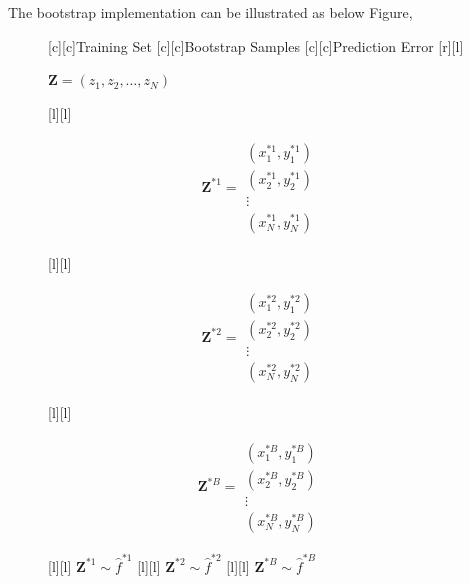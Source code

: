 \documentclass[12pt,a4paper]{article}%
\theoremstyle{definition}
\theoremstyle{plain}
\numberwithin{equation}{section}
\begin{document}
The bootstrap implementation can be illustrated as below Figure,
\begin{framed}
\begin{figure}[H]
\centering
{}[c][c]{Training Set}
[c][c]{Bootstrap Samples}
[c][c]{Prediction Error}
[r][l]{\parbox{1cm} {$\boldsymbol{Z}=(z_{1},z_{2},\dots,z_{N})$}}
[l][l]{\footnotesize \parbox{1cm}{  
\begin{gather*}
\boldsymbol{Z}^{*1} = 
\begin{array}{c}
(x^{*1}_{1},y^{*1}_{1}) \\
(x^{*1}_{2},y^{*1}_{2}) \\
\vdots \\
(x^{*1}_{N},y^{*1}_{N})
\end{array}
\end{gather*}
}}
[l][l]{\footnotesize \parbox{1cm}{  
\begin{gather*}
\boldsymbol{Z}^{*2} = 
\begin{array}{c}
(x^{*2}_{1},y^{*2}_{1}) \\
(x^{*2}_{2},y^{*2}_{2}) \\
\vdots \\
(x^{*2}_{N},y^{*2}_{N})
\end{array}
\end{gather*}
}}
[l][l]{\footnotesize \parbox{1cm}{  
\begin{gather*}
\boldsymbol{Z}^{*B} = 
\begin{array}{c}
(x^{*B}_{1},y^{*B}_{1}) \\
(x^{*B}_{2},y^{*B}_{2}) \\
\vdots \\
(x^{*B}_{N},y^{*B}_{N})
\end{array}
\end{gather*}
}}
[l][l]{\hspace{0.5cm} \footnotesize $\boldsymbol{Z}^{*1} \sim \hat{f}^{*1}$}
[l][l]{\hspace{0.5cm} \footnotesize $\boldsymbol{Z}^{*2} \sim \hat{f}^{*2}$}
[l][l]{\hspace{0.5cm} \footnotesize $\boldsymbol{Z}^{*B} \sim \hat{f}^{*B}$}


\end{figure}
\end{framed}
\end{document}
